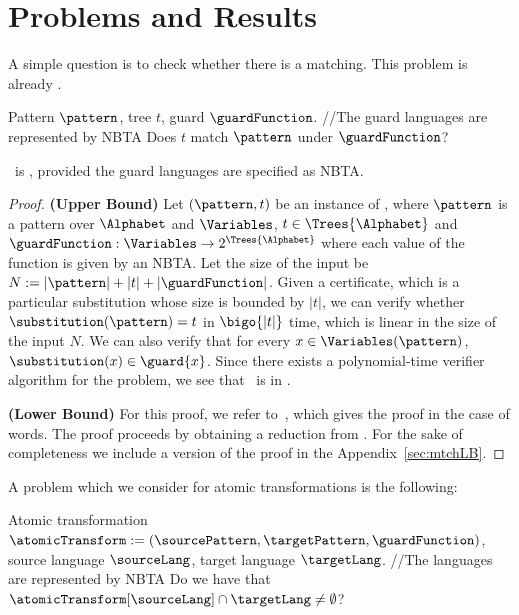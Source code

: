 \section{Problems and Results}\label{sec:problemsAndResults}

A simple question is to check whether there is a matching. This problem is already \npc.

\probdef{\matchingProblemFull}{\matchingProblemShort}
{Pattern $\pattern$, tree $t$, guard $\guardFunction$. {\color{gray} \slash\slash The guard languages are represented by NBTA }}
{Does $t$ match $\pattern$ under $\guardFunction$?}

\begin{theorem}\label{thm:matchingProblem}
    \matchingProblemFull\ is \npc, provided the guard languages are specified as NBTA.
\end{theorem}
\begin{proof}
    \textbf{(Upper Bound)} Let $(\pattern, t)$ be an instance of \matchingProblemFull, where $\pattern$ is a pattern over $\Alphabet$ and $\Variables$, $t \in \Trees{\Alphabet}$ and $\guardFunction : \Variables \to 2^{\Trees{\Alphabet}}$ where each value of the function is given by an NBTA. Let the size of the input be $N := |\pattern| + |t| + |\guardFunction|$. Given a certificate, which is a particular substitution whose size is bounded by $|t|$, we can verify whether $\substitution(\pattern) = t$ in $\bigo{|t|}$ time, which is linear in the size of the input $N$. We can also verify that for every $x \in \Variables(\pattern)$, $\substitution(x) \in \guard{x}$. Since there exists a polynomial-time verifier algorithm for the problem, we see that \matchingProblemFull\ is in \np.

    \textbf{(Lower Bound)} For this proof, we refer to~\cite{mtchLBound}, which gives the proof in the case of words. The proof proceeds by obtaining a reduction from \oneInThreeSatFull. For the sake of completeness we include a version of the proof in the Appendix~\ref{sec:mtchLB}.
\end{proof}

A problem which we consider for atomic transformations is the following:

\probdef{\atomicTypecheckingProblemFull}{\atomicTypecheckingProblemShort}
{Atomic transformation $\atomicTransform := (\sourcePattern, \targetPattern, \guardFunction)$, source language $\sourceLang$,  target language  $\targetLang$. {\color{gray} \slash\slash The  languages are represented by NBTA }}
{Do we have that $\atomicTransform[\sourceLang] \cap \targetLang \neq \emptyset$?}

